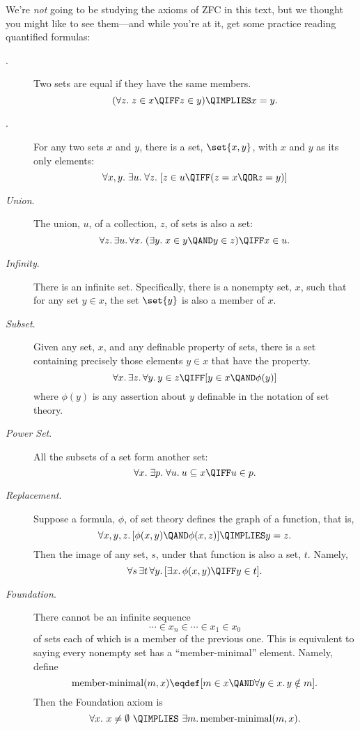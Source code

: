 We're \emph{not} going to be studying the axioms of ZFC in this text,
but we thought you might like to see them---and while you're at it,
get some practice reading quantified formulas:

\begin{description}

\item[.] Two sets are equal if they have the same
  members.
\[
(\forall z.\; z \in x \QIFF z \in y) \QIMPLIES x = y.
\]

\item[.] For any two sets $x$ and $y$, there is a set,
     $\set{x,y}$, with $x$ and $y$ as its only elements:
\[
\forall x,y.\; \exists u.\; \forall z.\;
[z \in u \QIFF (z = x \QOR z = y)]
\]

\item[\emph{Union}.]
The union, $u$, of a collection, $z$, of sets is also a set:
\[
\forall z.\, \exists u.\, \forall x.\; (\exists y.\; x \in y \QAND y \in z) \QIFF x \in u.
\]

\item[\emph{Infinity}.]  There is an infinite set.
  Specifically, there is a nonempty set, $x$, such that for any set $y \in
  x$, the set $\set{y}$ is also a member of $x$.

\item[\emph{Subset}.] Given any set, $x$, and any definable property of sets,
  there is a set containing precisely those elements $y \in x$ that
  have the property.
\[
\forall x.\, \exists z.\, \forall y.\, y \in z \QIFF [y \in x \QAND \phi(y)]
\]
where $\phi(y)$ is any assertion about $y$ definable in the notation
of set theory.

\item[\emph{Power Set}.]  All the subsets of a set form another set:
\[
\forall x.\; \exists p.\; \forall u.\: u \subseteq x \QIFF u \in p.
\]

\item[\emph{Replacement}.]  Suppose a formula, $\phi$,
  of set theory defines the graph of a function, that is,
\[
\forall x, y, z.\, [\phi(x,y) \QAND \phi(x,z)] \QIMPLIES y = z.
\]
Then the image of any set, $s$, under that function is also a set, $t$.  Namely,
\[
\forall s\, \exists t\, \forall y.\, [\exists x.\, \phi(x,y) \QIFF y \in t].
\]

\item[\emph{Foundation}.] 
There cannot be an infinite sequence
\[
\cdots \in x_n \in \cdots \in x_1 \in x_0
\]
of sets each of which is a member of the previous one.  This is equivalent
to saying every nonempty set has a ``member-minimal'' element.  Namely, define
\[
\text{member-minimal}(m, x) \eqdef [m \in x \QAND \forall y \in x.\, y \notin m].
\]
Then the Foundation axiom is
\[
\forall x.\ x \neq \emptyset\ \QIMPLIES\ \exists m.\, \text{member-minimal}(m, x).
\]


\end{description}
